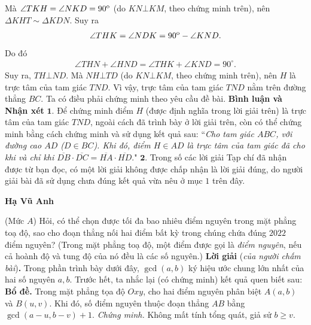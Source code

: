 \begin{multicols}{2}
	Mà  $\angle TKH = \angle NKD = {90^{\rm{o}}}$ (do $KN \bot KM$, theo chứng minh trên), nên $\Delta KHT \sim  \Delta KDN$. Suy ra
	\begin{align*}
		\angle THK = \angle NDK = {90^{\rm{o}}} - \angle KND.
	\end{align*}
	Do đó
	\begin{align*}
		\angle THN + \angle HND = \angle THK + \angle KND = {90^\circ}.
	\end{align*}
	Suy ra, $TH \bot ND$. Mà $NH \bot TD$ (do $KN \bot KM$, theo chứng minh trên), nên $H$ là trực tâm của tam giác $TND$. Vì vậy, trực tâm của tam giác $TND$ nằm trên đường thẳng $BC$.
	\vskip 0.05cm
	Ta có điều phải chứng minh theo yêu cầu đề bài.
	\vskip 0.05cm
	\textbf{\color{thachthuctoanhoc}Bình luận và Nhận xét}
	\vskip 0.05cm
	$\pmb{1.}$ Để chứng minh điểm $H$ (được định nghĩa trong lời giải trên) là trực tâm của tam giác $TND$, ngoài cách đã trình bày ở lời giải trên, còn có thể chứng minh bằng cách chứng minh và sử dụng kết quả sau:
	\vskip 0.05cm
	``\textit{Cho tam giác $ABC$, với đường cao $AD$ ($D \in BC$). Khi đó, điểm $H \in AD$ là trực tâm của tam giác đã cho khi và chỉ khi  $\overline {DB}  \cdot \overline {DC}  = \overline {HA}  \cdot \overline {HD} .$}"
	\vskip 0.05cm
	$\pmb{2.}$ Trong số các lời giải Tạp chí đã nhận được từ bạn đọc, có một lời giải không được chấp nhận là lời giải đúng, do người giải bài đã sử dụng chưa đúng kết quả vừa nêu ở mục $1$ trên đây.
	\begin{flushright}
		\textbf{\color{thachthuctoanhoc}Hạ Vũ Anh}
	\end{flushright}
	{}
	(Mức $A$) Hỏi, có thể chọn được tối đa bao nhiêu điểm nguyên trong mặt phẳng toạ độ, sao cho đoạn thẳng nối hai điểm bất kỳ trong chúng chứa đúng $2022$ điểm nguyên?
	\vskip 0.05cm
	(Trong mặt phẳng toạ độ, một điểm được gọi là {\it điểm nguyên}, nếu cả hoành độ và tung độ của nó đều là các số nguyên.)
	\vskip 0.05cm
	\textbf{\color{thachthuctoanhoc}Lời giải} (\textit{của người chấm bài})\textbf{\color{thachthuctoanhoc}.}
	\vskip 0.05cm
	Trong phần trình bày dưới đây, $\gcd(a, b)$ ký hiệu ước chung lớn nhất của hai số nguyên $a, b$.\vskip 0.05cm
	Trước hết, ta nhắc lại (có chứng minh) kết quả quen biết sau:
	\vskip 0.05cm
	\textbf{Bổ đề.} Trong mặt phẳng tọa độ $Oxy$, cho hai điểm nguyên phân biệt $A(a, b)$ và $B(u, v)$. Khi đó, số điểm nguyên thuộc đoạn thẳng $AB$ bằng $\gcd(a - u, b - v) + 1$.
	\vskip 0.05cm
	\textit{Chứng minh.}
	\vskip 0.05cm
	Không mất tính tổng quát, giả sử $b \ge  v$.
	\vskip 0.05cm

\end{multicols}

